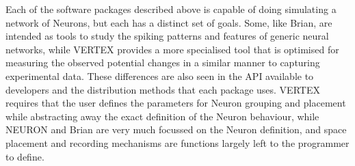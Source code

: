Each of the software packages described above is capable of doing simulating a
network of Neurons, but each has a distinct set of goals. Some, like Brian, are
intended as tools to study the spiking patterns and features of generic neural
networks, while VERTEX provides a more specialised tool that is optimised for
measuring the observed potential changes in a similar manner to capturing
experimental data. These differences are also seen in the API available to
developers
and the distribution methods that each package uses. VERTEX requires that the
user defines the parameters for Neuron grouping and placement while abstracting
away the exact definition of the Neuron behaviour, while NEURON and Brian are
very much focussed on the Neuron definition, and space placement and recording
mechanisms are functions largely left to the programmer to define.